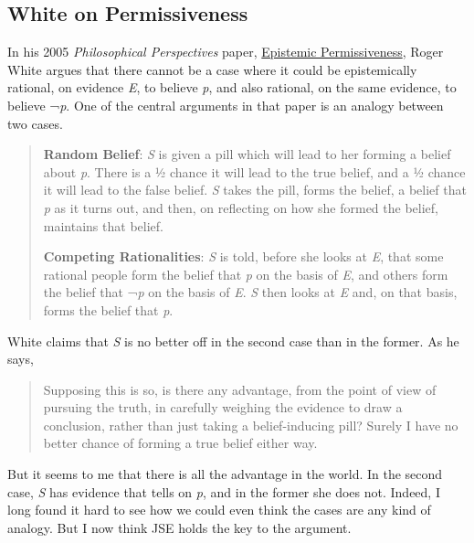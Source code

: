\documentclass[
  11pt,
  letterpaper,
  DIV=11,
  numbers=noendperiod,
  twoside]{scrartcl}
\begin{document}
\subsection{White on Permissiveness}\label{white-on-permissiveness}

In his 2005 \emph{Philosophical Perspectives} paper,
\href{http://philosophy.fas.nyu.edu/docs/IO/1180/EP.pdf}{Epistemic
Permissiveness}, Roger White argues that there cannot be a case where it
could be epistemically rational, on evidence \emph{E}, to believe
\emph{p}, and also rational, on the same evidence, to believe ¬\emph{p}.
One of the central arguments in that paper is an analogy between two
cases.

\begin{quote}
\textbf{Random Belief}: \emph{S} is given a pill which will lead to her
forming a belief about \emph{p}. There is a ½ chance it will lead to the
true belief, and a ½ chance it will lead to the false belief. \emph{S}
takes the pill, forms the belief, a belief that \emph{p} as it turns
out, and then, on reflecting on how she formed the belief, maintains
that belief.

\textbf{Competing Rationalities}: \emph{S} is told, before she looks at
\emph{E}, that some rational people form the belief that \emph{p} on the
basis of \emph{E}, and others form the belief that ¬\emph{p} on the
basis of \emph{E}. \emph{S} then looks at \emph{E} and, on that basis,
forms the belief that \emph{p}.
\end{quote}

White claims that \emph{S} is no better off in the second case than in
the former. As he says,

\begin{quote}
Supposing this is so, is there any advantage, from the point of view of
pursuing the truth, in carefully weighing the evidence to draw a
conclusion, rather than just taking a belief-inducing pill? Surely I
have no better chance of forming a true belief either way.
\end{quote}

But it seems to me that there is all the advantage in the world. In the
second case, \emph{S} has evidence that tells on \emph{p}, and in the
former she does not. Indeed, I long found it hard to see how we could
even think the cases are any kind of analogy. But I now think JSE holds
the key to the argument.
\end{document}
